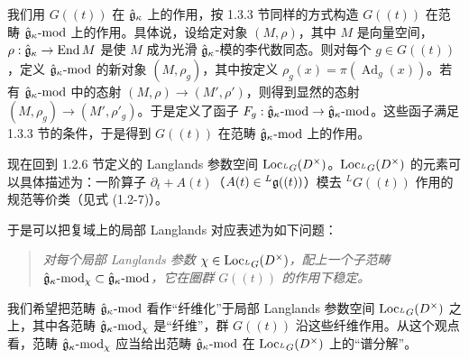 我们用 $G((t))$ 在 $\hat{\mathfrak{g}}_\kappa$ 上的作用，按 1.3.3 节同样的方式构造 $G((t))$ 在范畴 $\hat{\mathfrak{g}}_\kappa\text{-}\mathrm{mod}$ 上的作用。具体说，设给定对象 $(M,\rho)$，其中 $M$ 是向量空间，$\rho:\hat{\mathfrak{g}}_\kappa\to\operatorname{End} M$ 是使 $M$ 成为光滑 $\hat{\mathfrak{g}}_\kappa$-模的李代数同态。则对每个 $g\in G((t))$，定义 $\hat{\mathfrak{g}}_\kappa\text{-}\mathrm{mod}$ 的新对象 $(M,\rho_g)$，其中按定义 $\rho_g(x)=\pi(\operatorname{Ad}_g(x))$。若有 $\hat{\mathfrak{g}}_\kappa\text{-}\mathrm{mod}$ 中的态射 $(M,\rho)\to(M',\rho')$，则得到显然的态射 $(M,\rho_g)\to(M',\rho'_g)$。于是定义了函子 $F_g:\hat{\mathfrak{g}}_\kappa\text{-}\mathrm{mod}\to\hat{\mathfrak{g}}_\kappa\text{-}\mathrm{mod}$。这些函子满足 1.3.3 节的条件，于是得到 $G((t))$ 在范畴 $\hat{\mathfrak{g}}_\kappa\text{-}\mathrm{mod}$ 上的作用。

现在回到 1.2.6 节定义的 Langlands 参数空间 $\operatorname{Loc}_{{}^L G}(D^\times)$。$\operatorname{Loc}_{{}^L G}(D^\times)$ 的元素可以具体描述为：一阶算子 $\partial_t+A(t)$（$A(t)\in{}^L\mathfrak{g}((t))$）模去 ${}^L G((t))$ 作用的规范等价类（见式 (1.2-7)）。

于是可以把复域上的局部 Langlands 对应表述为如下问题：

\begin{quote}
\itshape
对每个局部 Langlands 参数 $\chi\in\operatorname{Loc}_{{}^L G}(D^\times)$，配上一个子范畴 $\hat{\mathfrak{g}}_\kappa\text{-}\mathrm{mod}_\chi\subset\hat{\mathfrak{g}}_\kappa\text{-}\mathrm{mod}$，它在圈群 $G((t))$ 的作用下稳定。
\end{quote}

我们希望把范畴 $\hat{\mathfrak{g}}_\kappa\text{-}\mathrm{mod}$ 看作“纤维化”于局部 Langlands 参数空间 $\operatorname{Loc}_{{}^L G}(D^\times)$ 之上，其中各范畴 $\hat{\mathfrak{g}}_\kappa\text{-}\mathrm{mod}_\chi$ 是“纤维”，群 $G((t))$ 沿这些纤维作用。从这个观点看，范畴 $\hat{\mathfrak{g}}_\kappa\text{-}\mathrm{mod}_\chi$ 应当给出范畴 $\hat{\mathfrak{g}}_\kappa\text{-}\mathrm{mod}$ 在 $\operatorname{Loc}_{{}^L G}(D^\times)$ 上的“谱分解”。

